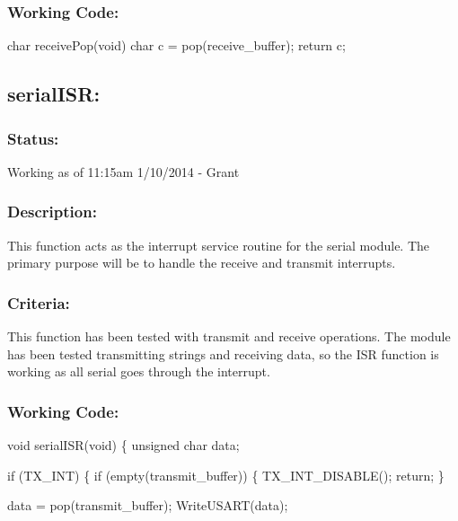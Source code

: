 \documentclass[]{article}
\begin{document}
\subsubsection{Working Code:}
char receivePop(void)
{
	char c = pop(receive\_buffer);
	return c;
}

\subsection{serialISR:}
\subsubsection{Status:}
Working as of 11:15am 1/10/2014 - Grant

\subsubsection{Description:}
This function acts as the interrupt service routine for the serial module. The primary purpose will be to handle the receive and transmit interrupts.

\subsubsection{Criteria:}
This function has been tested with transmit and receive operations. The module has been tested transmitting strings and receiving data, so the ISR function is working as all serial goes through the interrupt.

\subsubsection{Working Code:}
void serialISR(void) \newline
\{ \newline
	unsigned char data; \newline
	
	if (TX\_INT) \newline
	\{ \newline
		if (empty(transmit\_buffer))
		\{ \newline
			TX\_INT\_DISABLE(); \newline
			return; \newline
		\} \newline
		
		data = pop(transmit\_buffer); \newline
		WriteUSART(data); \newline
		
\end{document}

